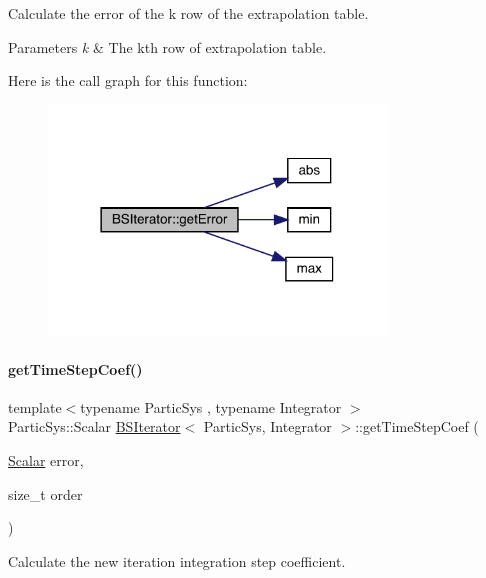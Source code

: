 Calculate the error of the k row of the extrapolation table. 


\begin{DoxyParams}{Parameters}
{\em k} & The kth row of extrapolation table. \\
\hline
\end{DoxyParams}
Here is the call graph for this function\+:\nopagebreak
\begin{figure}[H]
\begin{center}
\leavevmode
\includegraphics[width=254pt]{class_b_s_iterator_a9f50e084f8650e4d7fea3535a0547139_cgraph}
\end{center}
\end{figure}
\mbox{\label{class_b_s_iterator_a9d06a0d0c9e458ea96952b0514adece9}} 
\paragraph{\texorpdfstring{get\+Time\+Step\+Coef()}{getTimeStepCoef()}}
{\footnotesize\ttfamily template$<$typename Partic\+Sys , typename Integrator $>$ \\
Partic\+Sys\+::\+Scalar \mbox{\hyperlink{class_b_s_iterator}{B\+S\+Iterator}}$<$ Partic\+Sys, Integrator $>$\+::get\+Time\+Step\+Coef (\begin{DoxyParamCaption}\item[{\mbox{\hyperlink{class_b_s_iterator_a7857f8ff9032955ea4dcc22cd18ca7a1}{Scalar}}}]{error,  }\item[{size\+\_\+t}]{order }\end{DoxyParamCaption})\hspace{0.3cm}{\ttfamily [private]}}



Calculate the new iteration integration step coefficient. 


